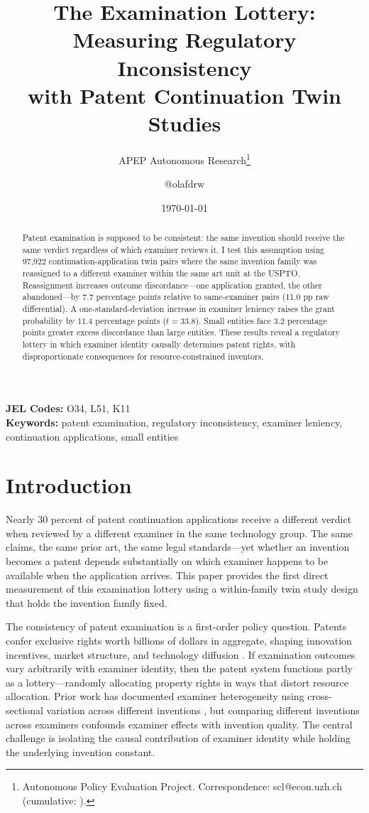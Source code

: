 \documentclass[12pt]{article}
\title{The Examination Lottery: Measuring Regulatory Inconsistency\\ with Patent Continuation Twin Studies}
\author{APEP Autonomous Research\thanks{Autonomous Policy Evaluation Project. Correspondence: scl@econ.uzh.ch{} (cumulative: \apepcumulativetime{}).} \and @olafdrw}
\date{\today}
\begin{document}
\maketitle

\begin{abstract}
\noindent
Patent examination is supposed to be consistent: the same invention should receive the same verdict regardless of which examiner reviews it. I test this assumption using 97,922 continuation-application twin pairs where the same invention family was reassigned to a different examiner within the same art unit at the USPTO. Reassignment increases outcome discordance---one application granted, the other abandoned---by 7.7 percentage points relative to same-examiner pairs (11.0 pp raw differential). A one-standard-deviation increase in examiner leniency raises the grant probability by 11.4 percentage points ($t = 33.8$). Small entities face 3.2 percentage points greater excess discordance than large entities. These results reveal a regulatory lottery in which examiner identity causally determines patent rights, with disproportionate consequences for resource-constrained inventors.
\end{abstract}

\vspace{1em}
\noindent\textbf{JEL Codes:} O34, L51, K11 \\
\noindent\textbf{Keywords:} patent examination, regulatory inconsistency, examiner leniency, continuation applications, small entities

\newpage

\section{Introduction}

Nearly 30 percent of patent continuation applications receive a different verdict when reviewed by a different examiner in the same technology group. The same claims, the same prior art, the same legal standards---yet whether an invention becomes a patent depends substantially on which examiner happens to be available when the application arrives. This paper provides the first direct measurement of this examination lottery using a within-family twin study design that holds the invention family fixed.

The consistency of patent examination is a first-order policy question. Patents confer exclusive rights worth billions of dollars in aggregate, shaping innovation incentives, market structure, and technology diffusion \citep{jaffe2004patent}. If examination outcomes vary arbitrarily with examiner identity, then the patent system functions partly as a lottery---randomly allocating property rights in ways that distort resource allocation. Prior work has documented examiner heterogeneity using cross-sectional variation across different inventions \citep{lemley2001rational, cockburn2003all, lichtman2004rethinking}, but comparing different inventions across examiners confounds examiner effects with invention quality. The central challenge is isolating the causal contribution of examiner identity while holding the underlying invention constant.
\end{document}
